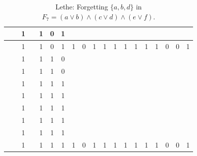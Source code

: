 \begin{table}[!tb]
\begin{tabular}{|c|c|c|c|c|c|c|c|c|c|c|c|c|c|c|c|c|c|c|}
        \rowcolor{blue!40}  &  & 1 &  & 1 & 0 & 1 &  &  &  &  &  &  &  &  &  &  &  &  \\ \hline
        \rowcolor{blue!40}  &  & 1 &  & 1 & 0 & 1 & 1 & 0 & 1 & 1 & 1 & 1 & 1 & 1 & 1 & 0 & 0 & 1 \\ \hline
        \rowcolor{red!40}  &  & 1 &  & 1 & 1 & 0 &  &  &  &  &  &  &  &  &  &  &  &  \\ \hline
        \rowcolor{red!40}  &  & 1 &  & 1 & 1 & 0 &  &  &  &  &  &  &  &  &  &  &  &  \\ \hline
        \rowcolor{red!40}  &  & 1 &  & 1 & 1 & 1 &  &  &  &  &  &  &  &  &  &  &  &  \\ \hline
        \rowcolor{red!40}  &  & 1 &  & 1 & 1 & 1 &  &  &  &  &  &  &  &  &  &  &  &  \\ \hline
        \rowcolor{red!40}  &  & 1 &  & 1 & 1 & 1 &  &  &  &  &  &  &  &  &  &  &  &  \\ \hline
        \rowcolor{red!40}  &  & 1 &  & 1 & 1 & 1 &  &  &  &  &  &  &  &  &  &  &  &  \\ \hline
        \rowcolor{red!40}  &  & 1 &  & 1 & 1 & 1 &  &  &  &  &  &  &  &  &  &  &  &  \\ \hline
        \rowcolor{red!40}  &  & 1 &  & 1 & 1 & 1 & 1 & 0 & 1 & 1 & 1 & 1 & 1 & 1 & 1 & 0 & 0 & 1 \\ \hline
    \end{tabular}
    \caption{Lethe: Forgetting $\{a, b, d\}$ in $F_{7} = (a \lor b) \land (c \lor d) \land (e \lor f)$.}
    \label{tab:lethe-F7-abd}
\end{table}
